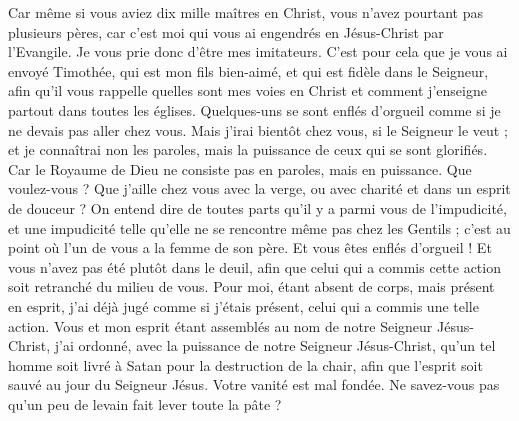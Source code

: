 \begin{multicols}{2}
Car même si vous aviez dix mille maîtres en Christ, vous n'avez pourtant pas plusieurs pères, car c'est moi qui vous ai engendrés en Jésus-Christ par l'Evangile.
Je vous prie donc d'être mes imitateurs.
C'est pour cela que je vous ai envoyé Timothée, qui est mon fils bien-aimé, et qui est fidèle dans le Seigneur, afin qu'il vous rappelle quelles sont mes voies en Christ et comment j'enseigne partout dans toutes les églises.
Quelques-uns se sont enflés d'orgueil comme si je ne devais pas aller chez vous.
Mais j'irai bientôt chez vous, si le Seigneur le veut ; et je connaîtrai non les paroles, mais la puissance de ceux qui se sont glorifiés.
Car le Royaume de Dieu ne consiste pas en paroles, mais en puissance.
Que voulez-vous ? Que j'aille chez vous avec la verge, ou avec charité et dans un esprit de douceur ?
\VerseOne{}On entend dire de toutes parts qu'il y a parmi vous de l'impudicité, et une impudicité telle qu'elle ne se rencontre même pas chez les Gentils ; c'est au point où l'un de vous a la femme de son père.
Et vous êtes enflés d'orgueil ! Et vous n'avez pas été plutôt dans le deuil, afin que celui qui a commis cette action soit retranché du milieu de vous.
Pour moi, étant absent de corps, mais présent en esprit, j'ai déjà jugé comme si j'étais présent, celui qui a commis une telle action.
Vous et mon esprit étant assemblés au nom de notre Seigneur Jésus-Christ, j'ai ordonné, avec la puissance de notre Seigneur Jésus-Christ,
qu'un tel homme soit livré à Satan pour la destruction de la chair, afin que l'esprit soit sauvé au jour du Seigneur Jésus.
Votre vanité est mal fondée. Ne savez-vous pas qu'un peu de levain fait lever toute la pâte ?

\end{multicols}
